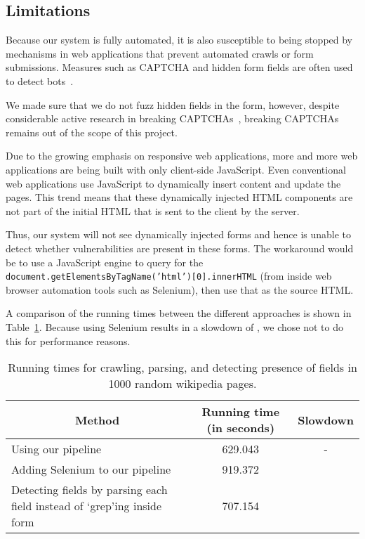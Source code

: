 \subsection[Limitations]{Limitations}
\label{limitations}

		Because our system is fully automated, it is also susceptible to being stopped by mechanisms in web applications that prevent automated crawls or form submissions. Measures such as CAPTCHA and hidden form fields are often used to detect bots~\cite{captchas3, captchas2}.

		We made sure that we do not fuzz hidden fields in the form, however, despite considerable active research in breaking CAPTCHAs~\cite{captchas2, captchas}, breaking CAPTCHAs remains out of the scope of this project.

	   Due to the growing emphasis on responsive web applications, more and more web applications are being built with only client-side  JavaScript. Even conventional web applications use JavaScript to dynamically insert content and update the pages. This trend means that these dynamically injected HTML components are not part of the initial HTML that is sent to the client by the server.

		Thus, our system will not see dynamically injected forms and hence is unable to detect whether \ehi vulnerabilities are present in these forms. The workaround would be to use a JavaScript engine to query for the \texttt{document.getElementsByTagName('html')[0].innerHTML} (from inside web browser automation tools such as Selenium), then use that as the source HTML. 
		
		A comparison of the running times between the different approaches is shown in Table~\ref{tab:perf}. Because using Selenium results in a slowdown of \slowSelenium, we chose not to do this for performance reasons. 
		
		\begin{table}
			\centering
			\begin{tabular}{|p{4cm}|c|c|}
				\hline
				\multicolumn{1}{|c}{\textbf{Method}} &
				\multicolumn{1}{|c|}{\textbf{Running time (in seconds)}} &
				\multicolumn{1}{|c|}{\textbf{Slowdown}}
				\\
				\hline
				\centering Using our pipeline & 629.043 & - \\
				\hline
				\centering Adding Selenium to our pipeline & 919.372 & \slowSelenium \\
				\hline				
				\centering Detecting \email fields by parsing each field instead of `grep'ing inside form & 707.154 & \slowParse \\								
				\hline
			\end{tabular}
			\label{tab:perf}
			\caption[\titlecap{}]{Running times for crawling, parsing, and detecting presence of \email fields in 1000 random wikipedia pages.}
		\end{table}

